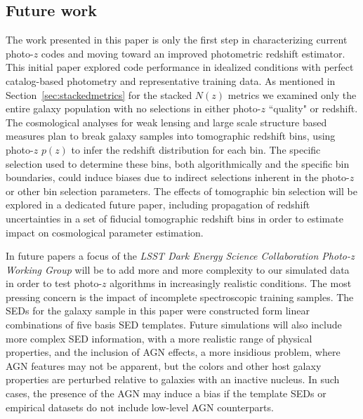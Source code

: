 \subsection{Future work}
\label{sec:futurework}
The work presented in this paper is only the first step in characterizing current photo-$z$ codes and moving toward an improved photometric redshift estimator.  This initial paper explored code performance in idealized conditions with perfect catalog-based photometry and representative training data.  As mentioned in Section~\ref{sec:stackedmetrics} for the stacked $N(z)$ metrics we examined only the entire galaxy population with no selections in either photo-$z$ ``quality" or redshift.  The cosmological analyses for weak lensing and large scale structure based measures plan to break galaxy samples into tomographic redshift bins, using photo-$z$ $p(z)$ to infer the redshift distribution for each bin.  The specific selection used to determine these bins, both algorithmically and the specific bin boundaries, could induce biases due to indirect selections inherent in the photo-$z$ or other bin selection parameters.  The effects of tomographic bin selection will be explored in a dedicated future paper, including propagation of redshift uncertainties in a set of fiducial tomographic redshift bins in order to estimate impact on cosmological parameter estimation.


In future papers a focus of the {\it LSST Dark Energy Science Collaboration Photo-z Working Group} will be to add more and more complexity to our simulated data in order to test photo-$z$ algorithms in increasingly realistic conditions.  The most pressing concern is the impact of incomplete spectroscopic training samples.  The SEDs for the galaxy sample in this paper were constructed form linear combinations of five basis SED templates.  Future simulations will also include more complex SED information, with a more realistic range of physical properties, and the inclusion of AGN effects, a more insidious problem, where AGN features may not be apparent, but the colors and other host galaxy properties are perturbed relative to galaxies with an inactive nucleus.  In such cases, the presence of the AGN may induce a bias if the template SEDs or empirical datasets do not include low-level AGN counterparts.


